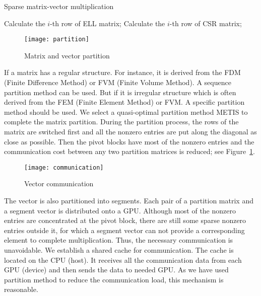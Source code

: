 \documentclass[runningheads,a4paper]{llncs}
\begin{document}
{\begin{algorithm}[htb]
\caption{Sparse matrix-vector multiplication}
\label{alg_spmv_single}
\begin{algorithmic}[1]
 
  \State Calculate the $i$-th row of ELL matrix; 
\EndFor
\State
{} 
  \State Calculate the $i$-th row of CSR matrix; 
\EndFor
\end{algorithmic}
\end{algorithm}

\begin{figure}[!tbh]
    \centering
    \texttt{[image: partition]}
    \caption{Matrix and vector partition}
    \label{fig_partition}
\end{figure}

If a matrix has a regular structure. For instance, it is derived from the FDM (Finite Difference Method) or FVM (Finite Volume Method). A sequence partition method can be used. But if it is irregular structure which is often derived from the FEM (Finite Element Method) or FVM. A specific partition method should be used. We select a quasi-optimal partition method METIS to complete the matrix partition. During the partition process, the rows of the matrix are switched first and all the nonzero entries are put along the diagonal as close as possible. Then the pivot blocks have most of the nonzero entries and the communication cost between any two partition matrices is reduced; see Figure~\ref{fig_partition}.

\begin{figure}[!tbh]
    \centering
    \texttt{[image: communication]}
    \caption{Vector communication}
    \label{fig_communication}
\end{figure}

The vector is also partitioned into segments. Each pair of a partition matrix and a segment vector is distributed onto a GPU. Although most of the nonzero entries are concentrated at the pivot block, there are still some sparse nonzero entries outside it, for which a segment vector can not provide a corresponding element to complete multiplication. Thus, the necessary communication is unavoidable. We establish a shared cache for communication. The cache is located on the CPU (host). It receives all the communication data from each GPU (device) and then sends the data to needed GPU. As we have used partition method to reduce the communication load, this mechanism is reasonable.

}
\end{document}

